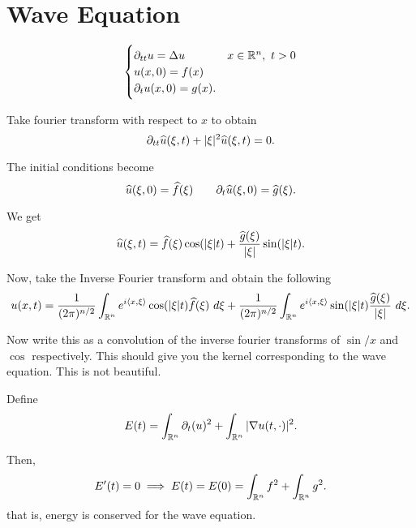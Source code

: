 \section*{Wave Equation}

\begin{equation*}
    \begin{cases}
    \partial_{tt} u = \Delta u & x\in\mathbb{R}^n,~t > 0\\
    u(x, 0) = f(x)\\
    \partial_t u(x, 0) = g(x).
    \end{cases}
\end{equation*}

Take fourier transform with respect to $x$ to obtain 
\begin{equation*}
    \partial_{tt}\widehat{u}(\xi, t) + |\xi|^2\widehat{u}(\xi, t) = 0.
\end{equation*}

The initial conditions become 
\begin{equation*}
    \widehat{u}(\xi, 0) = \widehat{f}(\xi)\qquad\partial_t\widehat{u}(\xi, 0) = \widehat{g}(\xi).
\end{equation*}

We get 
\begin{equation*}
    \widehat{u}(\xi, t) = \widehat{f}(\xi)\cos(|\xi|t) + \frac{\widehat{g}(\xi)}{|\xi|}\sin(|\xi|t).
\end{equation*}

Now, take the Inverse Fourier transform and obtain the following 
\begin{equation*}
    u(x, t) = \frac{1}{(2\pi)^{n/2}}\int_{\mathbb{R}^n} e^{i\langle x,\xi\rangle}\cos(|\xi|t)\widehat{f}(\xi)~d\xi + \frac{1}{(2\pi)^{n/2}}\int_{\mathbb{R}^n}e^{i\langle x,\xi\rangle}\sin(|\xi|t)\frac{\widehat{g}(\xi)}{|\xi|}~d\xi.
\end{equation*}

Now write this as a convolution of the inverse fourier transforms of $\sin/x$ and $\cos$ respectively. This should give you the kernel corresponding to the wave equation. This is not beautiful.

Define 
\begin{equation*}
    E(t) = \int_{\mathbb{R}^n}\partial_t(u)^2 + \int_{\mathbb{R}^n} |\nabla u(t, \cdot)|^2.
\end{equation*}

Then, 
\begin{equation*}
    E'(t) = 0\implies E(t) = E(0) = \int_{\mathbb{R}^n} f^2 + \int_{\mathbb{R}^n} g^2.
\end{equation*}
that is, energy is conserved for the wave equation.


